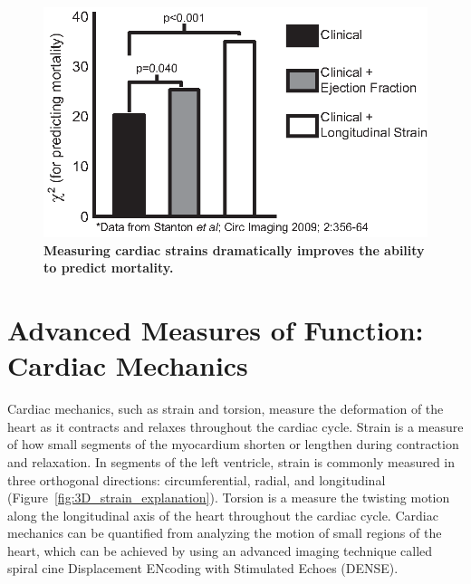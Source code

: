 	\begin{figure}
		\centering
		\includegraphics{figures/intro/stanton}
		\caption[Measuring cardiac strains dramatically improves the ability to predict mortality]{\textbf{Measuring cardiac strains dramatically improves the ability to predict mortality.}}
		\label{fig:stanton}
	\end{figure}

\section{Advanced Measures of Function: Cardiac Mechanics}
 	Cardiac mechanics, such as strain and torsion, measure the deformation of the heart as it contracts and relaxes throughout the cardiac cycle. Strain is a measure of how small segments of the myocardium shorten or lengthen during contraction and relaxation. In segments of the left ventricle, strain is commonly measured in three orthogonal directions: circumferential, radial, and longitudinal (Figure~\ref{fig:3D_strain_explanation}). Torsion is a measure the twisting motion along the longitudinal axis of the heart throughout the cardiac cycle. Cardiac mechanics can be quantified from analyzing the motion of small regions of the heart, which can be achieved by using an advanced imaging technique called spiral cine Displacement ENcoding with Stimulated Echoes (DENSE).
 	
